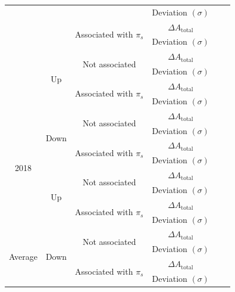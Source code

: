 \documentclass{article}
\begin{document}
\begin{center}
\begin{tabular}{c|c|c|c|c|c}
                        & & & Deviation $(\sigma)$ & & \\
                        \cline{3-5}
                        & & \multirow{2}{*}{Associated with $\pi_s$} & $\Delta A_\text{total}$ & & \\
                        & & & Deviation $(\sigma)$ & & \\
                        \cline{2-6}
                        & \multirow{4}{*}{Up} & \multirow{2}{*}{Not associated} & $\Delta A_\text{total}$ & & \\
                        & & & Deviation $(\sigma)$ & & \\
                        \cline{3-5}
                        & & \multirow{2}{*}{Associated with $\pi_s$} & $\Delta A_\text{total}$ & & \\
                        & & & Deviation $(\sigma)$ & & \\
                        \hline
                        \multirow{8}{*}{2018} & \multirow{4}{*}{Down} & \multirow{2}{*}{Not associated} & $\Delta A_\text{total}$ & & \\
                        & & & Deviation $(\sigma)$ & & \\
                        \cline{3-5}
                        & & \multirow{2}{*}{Associated with $\pi_s$} & $\Delta A_\text{total}$ & & \\
                        & & & Deviation $(\sigma)$ & & \\
                        \cline{2-6}
                        & \multirow{4}{*}{Up} & \multirow{2}{*}{Not associated} & $\Delta A_\text{total}$ & & \\
                        & & & Deviation $(\sigma)$ & & \\
                        \cline{3-5}
                        & & \multirow{2}{*}{Associated with $\pi_s$} & $\Delta A_\text{total}$ & & \\
                        & & & Deviation $(\sigma)$ & & \\
                        \hline\hline
                        \multirow{8}{*}{Average} & \multirow{4}{*}{Down} & \multirow{2}{*}{Not associated} & $\Delta A_\text{total}$ & & \\
                        & & & Deviation $(\sigma)$ & & \\
                        \cline{3-5}
                        & & \multirow{2}{*}{Associated with $\pi_s$} & $\Delta A_\text{total}$ & & \\
                        & & & Deviation $(\sigma)$ & & \\

\end{tabular}
\end{center}
\end{document}
